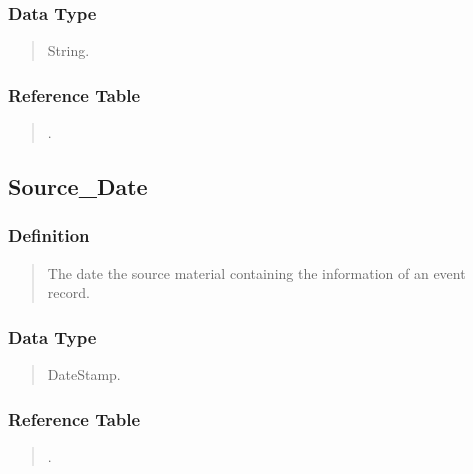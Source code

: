 \documentclass[letterpaper,10pt,english]{sphinxmanual}
\begin{document}
\subsubsection{Data Type}
\label{\detokenize{schema_tables:id15}}\begin{quote}

\sphinxAtStartPar
String.
\end{quote}


\subsubsection{Reference Table}
\label{\detokenize{schema_tables:id16}}\begin{quote}

\sphinxAtStartPar
{\hyperref[\detokenize{schema_tables:overview-table}]{}}.
\end{quote}


\subsection{Source\_Date}
\label{\detokenize{schema_tables:source-date}}

\subsubsection{Definition}
\label{\detokenize{schema_tables:id17}}\begin{quote}

\sphinxAtStartPar
The date the source material containing the information of an event record.
\end{quote}


\subsubsection{Data Type}
\label{\detokenize{schema_tables:id18}}\begin{quote}

\sphinxAtStartPar
DateStamp.
\end{quote}


\subsubsection{Reference Table}
\label{\detokenize{schema_tables:id19}}\begin{quote}

\sphinxAtStartPar
{\hyperref[\detokenize{schema_tables:overview-table}]{}}.
\end{quote}
\end{document}

